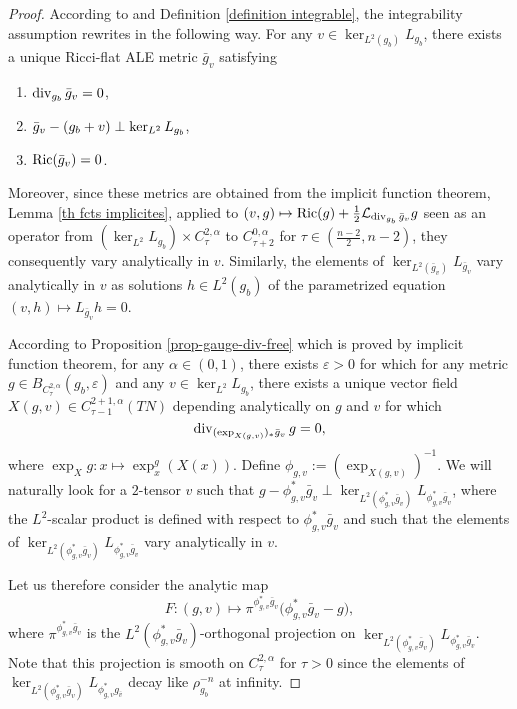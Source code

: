 \documentclass[a4paper,11pt,reqno]{amsart}
\def\Ric{\mathop{\rm Ric}\nolimits}
\def\div{\mathop{\rm div}\nolimits}
\def\Ric{\mathop{\rm Ric}\nolimits}
\def\div{\mathop{\rm div}\nolimits}
\numberwithin{equation}{section}
\begin{document}
	\begin{proof}
		According to \cite[Corollary 5.16]{ozu2} and Definition \ref{definition integrable}, the integrability assumption rewrites in the following way. For any $v\in\ker_{L^2(g_b)}L_{g_b}$, there exists a unique Ricci-flat ALE metric $\bar{g}_v$ satisfying
		\begin{enumerate}
			\item $\div_{g_b}\Bar{g}_v=0$,
			\item $\Bar{g}_v-(g_b+v)\perp \ker_{L^2}L_{g_b}$,
			\item $\Ric(\bar{g}_v) = 0$.
		\end{enumerate}
		Moreover, since these metrics are obtained from the implicit function theorem, Lemma \ref{th fcts implicites}, applied to $(v,g)\mapsto \Ric(g) + \frac{1}{2}\mathcal{L}_{\div_{g_b}\Bar{g}_v}g$ seen as an operator from $(\ker_{L^2}L_{g_b})\times C^{2,\alpha}_\tau$ to $C^{0,\alpha}_{\tau+2}$ for $\tau\in (\frac{n-2}{2},n-2)$, they consequently vary analytically in $v$. Similarly, the elements of $\ker_{L^2(\bar{g}_v)}L_{\bar{g}_v}$ vary analytically in $v$ as solutions $h\in L^2(g_b)$ of the parametrized equation $(v,h)\mapsto L_{\bar{g}_v} h = 0$.
		
		According to Proposition \ref{prop-gauge-div-free} which is proved by implicit function theorem, for any $\alpha\in(0,1)$, there exists $\varepsilon>0$ for which for any metric $g\in B_{C^{2,\alpha}_\tau}(g_b,\varepsilon)$ and any $v\in \ker_{L^2}L_{g_b}$, there exists a unique vector field $X(g,v)\in C^{2+1,\alpha}_{\tau-1}(TN)$ depending analytically on $g$ and $v$ for which
		$$\div_{(\exp_{X(g,v)})_*\bar{g}_v}g =0,$$
		where $\exp_{X}g:x \mapsto \exp_x^{g}(X(x))$. Define $\phi_{g,v} := (\exp_{X(g,v)})^{-1}$. We will naturally look for a $2$-tensor $v$ such that $g - \phi_{g,v}^*\bar{g}_v\perp \ker_{L^2(\phi_{g,v}^*\bar{g}_v)}L_{\phi_{g,v}^*\bar{g}_v}$, where the $L^2$-scalar product is defined with respect to $\phi_{g,v}^*\bar{g}_v$ and such that the elements of $\ker_{L^2(\phi_{g,v}^*\bar{g}_v)}L_{\phi_{g,v}^*\bar{g}_v}$ vary analytically in $v$. 
		
		Let us therefore consider the analytic map
		$$F:(g,v)\mapsto \pi^{\phi_{g,v}^*\bar{g}_v}\big(\phi_{g,v}^*\bar{g}_v-g\big),$$
		where $\pi^{\phi_{g,v}^*\bar{g}_v}$ is the $L^2(\phi_{g,v}^*\bar{g}_v)$-orthogonal projection on $\ker_{L^2(\phi_{g,v}^*\bar{g}_v)}L_{\phi_{g,v}^*\bar{g}_v}$. Note that this projection is smooth on $C^{2,\alpha}_\tau$ for $\tau>0$ since the elements of $\ker_{L^2(\phi_{g,v}^*\bar{g}_v)}L_{\phi^*_{g,v}g_{\bar{v}}}$ decay like $\rho_{g_b}^{-n}$ at infinity. 
		

\end{proof}
\end{document}
